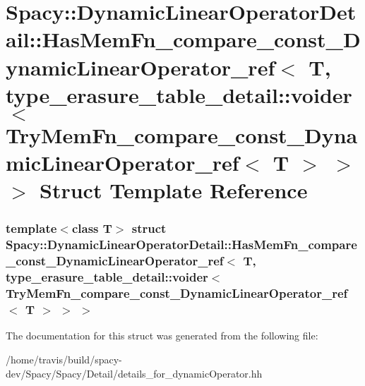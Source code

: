 \hypertarget{structSpacy_1_1DynamicLinearOperatorDetail_1_1HasMemFn__compare__const__DynamicLinearOperator__rb69170d8ed95e3ac47448ae0d049551b}{\section{\-Spacy\-:\-:\-Dynamic\-Linear\-Operator\-Detail\-:\-:\-Has\-Mem\-Fn\-\_\-compare\-\_\-const\-\_\-\-Dynamic\-Linear\-Operator\-\_\-ref$<$ \-T, type\-\_\-erasure\-\_\-table\-\_\-detail\-:\-:voider$<$ \-Try\-Mem\-Fn\-\_\-compare\-\_\-const\-\_\-\-Dynamic\-Linear\-Operator\-\_\-ref$<$ \-T $>$ $>$ $>$ \-Struct \-Template \-Reference}
\label{structSpacy_1_1DynamicLinearOperatorDetail_1_1HasMemFn__compare__const__DynamicLinearOperator__rb69170d8ed95e3ac47448ae0d049551b}
}
\subsubsection*{template$<$class T$>$ struct Spacy\-::\-Dynamic\-Linear\-Operator\-Detail\-::\-Has\-Mem\-Fn\-\_\-compare\-\_\-const\-\_\-\-Dynamic\-Linear\-Operator\-\_\-ref$<$ T, type\-\_\-erasure\-\_\-table\-\_\-detail\-::voider$<$ Try\-Mem\-Fn\-\_\-compare\-\_\-const\-\_\-\-Dynamic\-Linear\-Operator\-\_\-ref$<$ T $>$ $>$ $>$}



\-The documentation for this struct was generated from the following file\-:\begin{DoxyCompactItemize}
\item 
/home/travis/build/spacy-\/dev/\-Spacy/\-Spacy/\-Detail/details\-\_\-for\-\_\-dynamic\-Operator.\-hh\end{DoxyCompactItemize}
